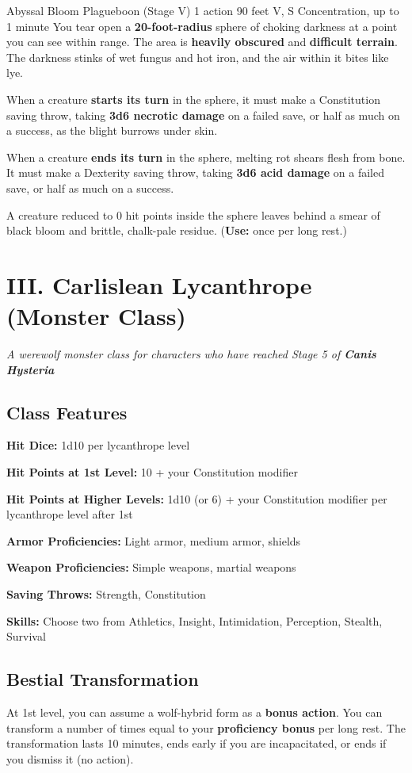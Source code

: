 \documentclass[letterpaper,twocolumn,openany,nodeprecatedcode,breakable,skins,xparse,most]{dndbook}
\begin{document}
\medskip

\DndSpellHeader%
  {Abyssal Bloom}
  {Plagueboon (Stage V)}
  {1 action}
  {90 feet}
  {V, S}
  {Concentration, up to 1 minute}
You tear open a \textbf{20-foot-radius} sphere of choking darkness at a point you can see within range. The area is \textbf{heavily obscured} and \textbf{difficult terrain}. The darkness stinks of wet fungus and hot iron, and the air within it bites like lye.

When a creature \textbf{starts its turn} in the sphere, it must make a Constitution saving throw, taking \textbf{3d6 necrotic damage} on a failed save, or half as much on a success, as the blight burrows under skin.

When a creature \textbf{ends its turn} in the sphere, melting rot shears flesh from bone. It must make a Dexterity saving throw, taking \textbf{3d6 acid damage} on a failed save, or half as much on a success.

A creature reduced to 0 hit points inside the sphere leaves behind a smear of black bloom and brittle, chalk-pale residue.
(\textbf{Use:} once per long rest.)

\newpage

\section{III. Carlislean Lycanthrope (Monster Class)}
\textit{A werewolf monster class for characters who have reached Stage 5 of \textbf{Canis Hysteria}}

\subsection*{Class Features}
\textbf{Hit Dice:} 1d10 per lycanthrope level

\textbf{Hit Points at 1st Level:} 10 + your Constitution modifier

\textbf{Hit Points at Higher Levels:} 1d10 (or 6) + your Constitution modifier per lycanthrope level after 1st

\textbf{Armor Proficiencies:} Light armor, medium armor, shields

\textbf{Weapon Proficiencies:} Simple weapons, martial weapons

\textbf{Saving Throws:} Strength, Constitution

\textbf{Skills:} Choose two from Athletics, Insight, Intimidation, Perception, Stealth, Survival

\subsection*{Bestial Transformation}
At 1st level, you can assume a wolf-hybrid form as a \textbf{bonus action}. You can transform a number of times equal to your \textbf{proficiency bonus} per long rest. The transformation lasts 10 minutes, ends early if you are incapacitated, or ends if you dismiss it (no action).
\end{document}
